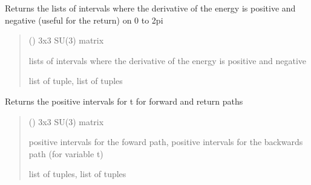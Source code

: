 \documentclass[letterpaper,10pt,english]{sphinxmanual}
\begin{document}
\begin{fulllineitems}
\label{\detokenize{numerical_reject:numerical_reject.intervalle_signes}}
\pysigstartsignatures
\pysiglinewithargsret
{}
{}
{}
\pysigstopsignatures
\sphinxAtStartPar
Returns the lists of intervals where the derivative of the energy is positive and negative (useful for the return) on 0 to 2pi
\begin{quote}\begin{description}
\sphinxAtStartPar
{} () \textendash{} 3x3 SU(3) matrix

\sphinxAtStartPar
lists of intervals where the derivative of the energy is positive and negative

\sphinxAtStartPar
list of tuple, list of tuples

\end{description}\end{quote}

\end{fulllineitems}


\begin{fulllineitems}
\label{\detokenize{numerical_reject:numerical_reject.intervalles_aller_retour}}
\pysigstartsignatures
\pysiglinewithargsret
{}
{}
{}
\pysigstopsignatures
\sphinxAtStartPar
Returns the positive intervals for t for forward and return paths
\begin{quote}\begin{description}
\sphinxAtStartPar
{} () \textendash{} 3x3 SU(3) matrix

\sphinxAtStartPar
positive intervals for the foward path, positive intervals for the backwards path (for variable t)

\sphinxAtStartPar
list of tuples, list of tuples

\end{description}\end{quote}

\end{fulllineitems}
\end{document}
